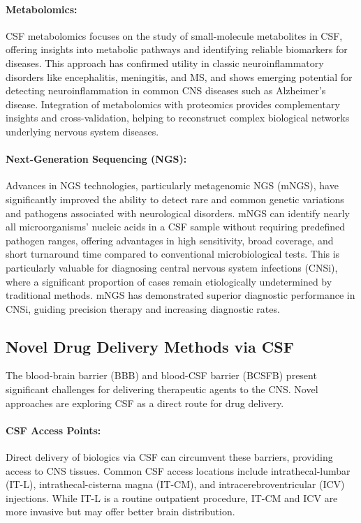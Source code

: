 	\paragraph{Metabolomics:} CSF metabolomics focuses on the study of small-molecule metabolites in CSF, offering insights into metabolic pathways and identifying reliable biomarkers for diseases. This approach has confirmed utility in classic neuroinflammatory disorders like encephalitis, meningitis, and MS, and shows emerging potential for detecting neuroinflammation in common CNS diseases such as Alzheimer's disease. Integration of metabolomics with proteomics provides complementary insights and cross-validation, helping to reconstruct complex biological networks underlying nervous system diseases.
	
	\paragraph{Next-Generation Sequencing (NGS):} Advances in NGS technologies, particularly metagenomic NGS (mNGS), have significantly improved the ability to detect rare and common genetic variations and pathogens associated with neurological disorders. mNGS can identify nearly all microorganisms' nucleic acids in a CSF sample without requiring predefined pathogen ranges, offering advantages in high sensitivity, broad coverage, and short turnaround time compared to conventional microbiological tests. This is particularly valuable for diagnosing central nervous system infections (CNSi), where a significant proportion of cases remain etiologically undetermined by traditional methods. mNGS has demonstrated superior diagnostic performance in CNSi, guiding precision therapy and increasing diagnostic rates.
	
	\subsection*{Novel Drug Delivery Methods via CSF}
	
	The blood-brain barrier (BBB) and blood-CSF barrier (BCSFB) present significant challenges for delivering therapeutic agents to the CNS. Novel approaches are exploring CSF as a direct route for drug delivery.
	
	\paragraph{CSF Access Points:} Direct delivery of biologics via CSF can circumvent these barriers, providing access to CNS tissues. Common CSF access locations include intrathecal-lumbar (IT-L), intrathecal-cisterna magna (IT-CM), and intracerebroventricular (ICV) injections. While IT-L is a routine outpatient procedure, IT-CM and ICV are more invasive but may offer better brain distribution.
	
